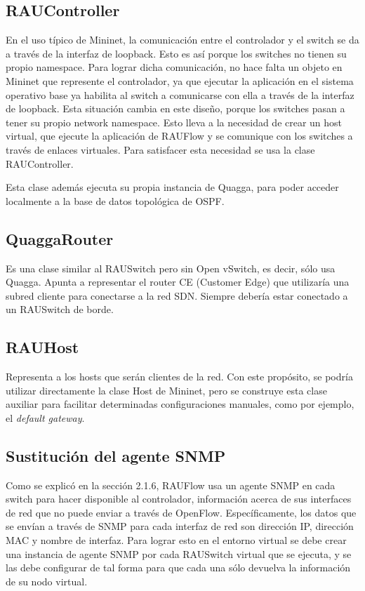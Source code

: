 \subsection{RAUController}
En el uso típico de Mininet, la comunicación entre el controlador y el switch se da a través de la interfaz de loopback. Esto es así porque los switches no tienen su propio namespace. Para lograr dicha comunicación, no hace falta un objeto en Mininet que represente el controlador, ya que ejecutar la aplicación en el sistema operativo base ya habilita al switch a comunicarse con ella a través de la interfaz de loopback. Esta situación cambia en este diseño, porque los switches pasan a tener su propio network namespace. Esto lleva a la necesidad de crear un host virtual, que ejecute la aplicación de RAUFlow y se comunique con los switches a través de enlaces virtuales. Para satisfacer esta necesidad se usa la clase RAUController.

Esta clase además ejecuta su propia instancia de Quagga, para poder acceder localmente a la base de datos topológica de OSPF.

\subsection{QuaggaRouter}
Es una clase similar al RAUSwitch pero sin Open vSwitch, es decir, sólo usa Quagga. Apunta a representar el router CE (Customer Edge) que utilizaría una subred cliente para conectarse a la red SDN. Siempre debería estar conectado a un RAUSwitch de borde.

\subsection{RAUHost}
Representa a los hosts que serán clientes de la red. Con este propósito, se podría utilizar directamente la clase Host de Mininet, pero se construye esta clase auxiliar para facilitar determinadas configuraciones manuales, como por ejemplo, el \textit{default gateway}.

\subsection{Sustitución del agente SNMP}
Como se explicó en la sección 2.1.6, RAUFlow usa un agente SNMP en cada switch para hacer disponible al controlador, información acerca de sus interfaces de red que no puede enviar a través de OpenFlow. Específicamente, los datos que se envían a través de SNMP para cada interfaz de red son dirección IP, dirección MAC y nombre de interfaz. Para lograr esto en el entorno virtual se debe crear una instancia de agente SNMP por cada RAUSwitch virtual que se ejecuta, y se las debe configurar de tal forma para que cada una sólo devuelva la información de su nodo virtual.


